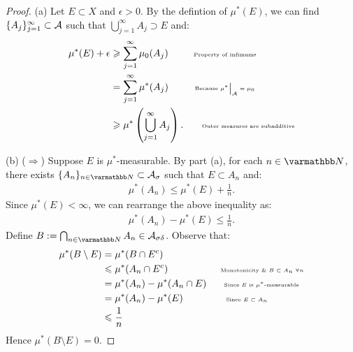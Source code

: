     \begin{proof}
        (a) Let $E \subset X$ and $\epsilon > 0$. By the defintion of $\mu^\ast(E)$, we can find $\{A_j\}_{j = 1}^\infty \subset \mathcal{A}$ such that $\bigcup_{j = 1}^\infty A_j \supset E$ and: 
            \begin{equation*}
            \begin{split}
                \mu^\ast(E) + \epsilon 
                & \geq \sum_{j = 1}^\infty \mu_0(A_j) \h9\h9\h8\text{\tiny Property of infimums}\\ 
                & = \sum_{j = 1}^\infty \mu^\ast (A_j) \h9\h9\h9 \text{\tiny Because $\restr{\mu^\ast}{\cA} = \mu_0$}\\
                & \geq \mu^\ast \left( \bigcup_{j = 1}^\infty A_j \right). \h9\h9\h1\text{\tiny Outer measures are subadditive}
            \end{split}
            \end{equation*}

        (b) ($\Rightarrow$) Suppose $E$ is $\mu^\ast$-measurable. By part (a), for each $n \in \bfN$, there exists $\{A_n\}_{n \in \bfN} \subset \cA_\sigma$ such that $E \subset A_n$ and:
            \begin{equation*}
            \begin{split}
                \mu^\ast(A_n) \leq \mu^\ast(E) + \frac{1}{n}.
            \end{split}
            \end{equation*}
        Since $\mu^\ast(E) < \infty$, we can rearrange the above inequality as:
            \begin{equation*}
            \begin{split}
                \mu^\ast(A_n) - \mu^\ast(E) \leq \frac{1}{n}.
            \end{split}
            \end{equation*}
        Define $B := \bigcap_{n \in \bfN}A_n \in \cA_{\sigma\delta}$. Observe that:
            \begin{equation*}
            \begin{split}
                \mu^\ast(B \setminus E)
                & = \mu^\ast(B \cap E^c) \\
                & \leq \mu^\ast (A_n \cap E^c) \h9\h9\h9\h9
                \h9\h9\text{\tiny Monotonicity \& $B \subset A_n$ $\forall n$}\\
                & = \mu^\ast(A_n) - \mu^\ast(A_n \cap E) \h9\h9\text{\tiny Since $E$ is $\mu^\ast$-measurable} \\
                & = \mu^\ast(A_n) - \mu^\ast(E) \h9\h9\h9\h9\h8 \text{\tiny Since $E \subset A_n$}\\
                & \leq \frac{1}{n} 
            \end{split}
            \end{equation*}
        Hence $\mu^\ast(B \setminus E) = 0$. 


\end{proof}
